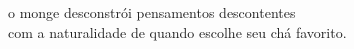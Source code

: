 o monge desconstrói pensamentos descontentes\\
com a naturalidade de quando escolhe seu chá favorito.
